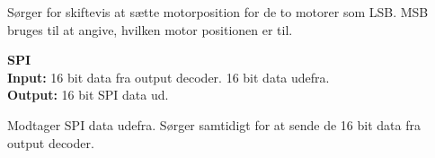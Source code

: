 Sørger for skiftevis at sætte motorposition for de to motorer som LSB.
MSB bruges til at angive, hvilken motor positionen er til.

\textbf{SPI}\\
\textbf{Input:} 16 bit data fra output decoder. 16 bit data udefra.\\
\textbf{Output:} 16 bit SPI data ud.

Modtager SPI data udefra. Sørger samtidigt for at sende de 16 bit data fra output decoder.





